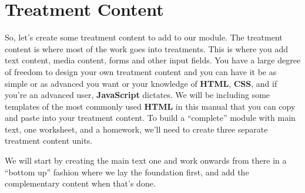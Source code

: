 \documentclass[
]{book}
\begin{document}
\section{Treatment Content}\label{treatment-content}

So, let's create some treatment content to add to our module. The treatment content is where most of the work goes into treatments. This is where you add text content, media content, forms and other input fields. You have a large degree of freedom to design your own treatment content and you can have it be as simple or as advanced you want or your knowledge of \textbf{HTML}, \textbf{CSS}, and if you're an advanced user, \textbf{JavaScript} dictates. We will be including some templates of the most commonly used \textbf{HTML} in this manual that you can copy and paste into your treatment content. To build a ``complete'' module with main text, one worksheet, and a homework, we'll need to create three separate treatment content units.

We will start by creating the main text one and work onwards from there in a ``bottom up'' fashion where we lay the foundation first, and add the complementary content when that's done.
\end{document}
